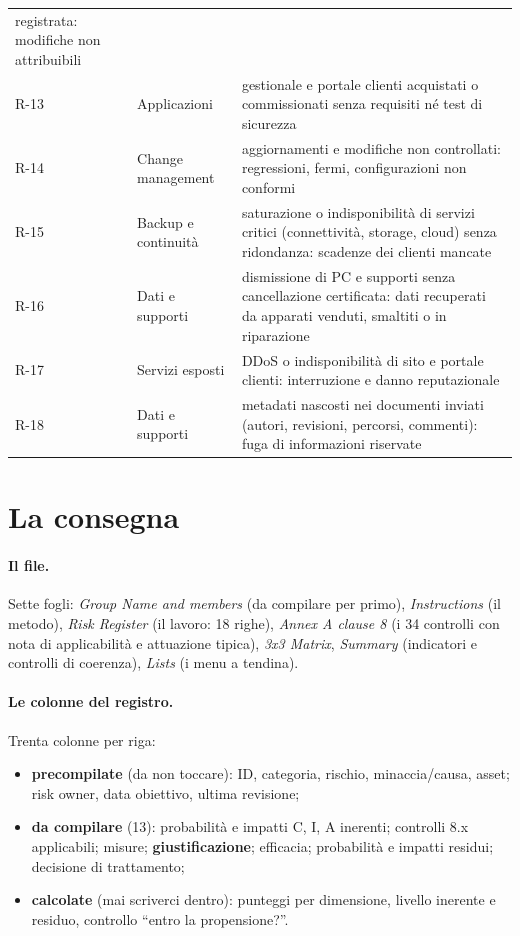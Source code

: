 \begin{center}
\begin{tabularx}{\linewidth}{l >{\raggedright\arraybackslash}p{3.2cm} X}
  registrata: modifiche non attribuibili \\
R-13 & Applicazioni & gestionale e portale clienti acquistati o commissionati senza requisiti né test di
  sicurezza \\
R-14 & Change management & aggiornamenti e modifiche non controllati: regressioni, fermi, configurazioni
  non conformi \\
R-15 & Backup e continuità & saturazione o indisponibilità di servizi critici (connettività, storage,
  cloud) senza ridondanza: scadenze dei clienti mancate \\
R-16 & Dati e supporti & dismissione di PC e supporti senza cancellazione certificata: dati recuperati
  da apparati venduti, smaltiti o in riparazione \\
R-17 & Servizi esposti & DDoS o indisponibilità di sito e portale clienti: interruzione e danno
  reputazionale \\
R-18 & Dati e supporti & metadati nascosti nei documenti inviati (autori, revisioni, percorsi,
  commenti): fuga di informazioni riservate \\ \bottomrule
\end{tabularx}
\end{center}

\section{La consegna}

\paragraph{Il file.} Sette fogli: \emph{Group Name and members} (da compilare per primo),
\emph{Instructions} (il metodo), \emph{Risk Register} (il lavoro: 18 righe), \emph{Annex A clause 8}
(i 34 controlli con nota di applicabilità e attuazione tipica), \emph{3x3 Matrix}, \emph{Summary}
(indicatori e controlli di coerenza), \emph{Lists} (i menu a tendina).

\paragraph{Le colonne del registro.} Trenta colonne per riga:
\begin{itemize}
  \item \textbf{precompilate} (da non toccare): ID, categoria, rischio, minaccia/causa, asset; risk owner,
    data obiettivo, ultima revisione;
  \item \textbf{da compilare} (13): probabilità e impatti C, I, A inerenti; controlli 8.x applicabili;
    misure; \textbf{giustificazione}; efficacia; probabilità e impatti residui; decisione di trattamento;
  \item \textbf{calcolate} (mai scriverci dentro): punteggi per dimensione, livello inerente e residuo,
    controllo ``entro la propensione?''.
\end{itemize}

